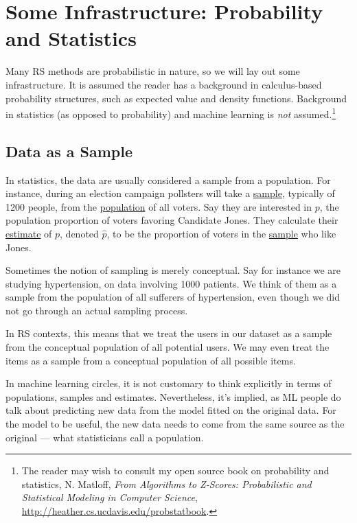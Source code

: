 \chapter{Some Infrastructure: Probability and Statistics}
\label{chap:infra2}   

Many RS methods are probabilistic in nature, so we will lay out some
infrastructure.  It is assumed the reader has a background in
calculus-based probability structures, such as expected value and
density functions.  Background in statistics (as opposed to probability)
and machine learning is \textit{not} assumed.\footnote{The reader may
wish to consult my open source book on probability and statistics, N.
Matloff, \textit{From Algorithms to Z-Scores: Probabilistic and
Statistical Modeling in Computer Science},
\url{http://heather.cs.ucdavis.edu/probstatbook}.}

\section{Data as a Sample}

In statistics, the data are usually considered a sample from a
population.  For instance, during an election campaign pollsters will
take a \underline{sample}, typically of 1200 people, from the
\underline{population} of all voters.  Say they are interested in $p$,
the population proportion of voters favoring Candidate Jones. They
calculate their \underline{estimate} of $p$, denoted $\widehat{p}$, to
be the proportion of voters in the \underline{sample} who like Jones.

Sometimes the notion of sampling is merely conceptual. Say for instance
we are studying hypertension, on data involving 1000 patients.  We think
of them as a sample from the population of all sufferers of
hypertension, even though we did not go through an actual sampling
process.

In RS contexts, this means that we treat the users in our dataset as a
sample from the conceptual population of all potential users.  We may
even treat the items as a sample from a conceptual population of all
possible items.

In machine learning circles, it is not customary to think explicitly in
terms of populations, samples and estimates.  Nevertheless, it's
implied, as ML people do talk about predicting new data from the model
fitted on the original data.  For the model to be useful, the new data
needs to come from the same source as the original --- what
statisticians call a population.

